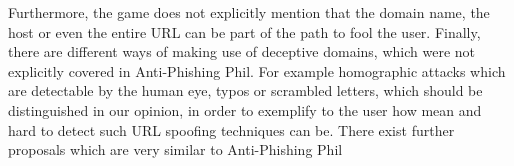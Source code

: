 Furthermore, the game does not explicitly mention that the domain name, the host or even the entire URL can be part of the path to fool the user. 
Finally, there are different ways of making use of deceptive domains, which were not explicitly covered in Anti-Phishing Phil. 
For example homographic attacks which are detectable by the human eye, typos or scrambled letters, which should be distinguished in our opinion, in order to exemplify to the user how mean and hard to detect such URL spoofing techniques can be. 
There exist further proposals which are very similar to Anti-Phishing Phil~\cite{arachchilage2011designing,arachchilage2012designing}




